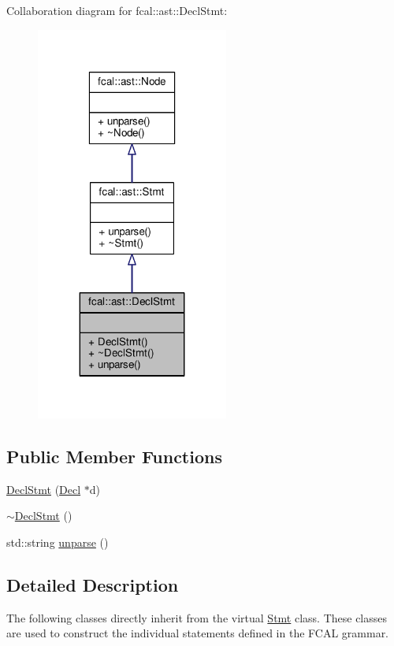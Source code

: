 Collaboration diagram for fcal\+:\+:ast\+:\+:Decl\+Stmt\+:
\nopagebreak
\begin{figure}[H]
\begin{center}
\leavevmode
\includegraphics[width=179pt]{classfcal_1_1ast_1_1DeclStmt__coll__graph}
\end{center}
\end{figure}
\subsection*{Public Member Functions}
\begin{DoxyCompactItemize}
\item 
\hyperlink{classfcal_1_1ast_1_1DeclStmt_a5e958867a6deda40d828b0416406485b}{Decl\+Stmt} (\hyperlink{classfcal_1_1ast_1_1Decl}{Decl} $\ast$d)
\item 
\hyperlink{classfcal_1_1ast_1_1DeclStmt_ae9dfa80c23f0dd282556a7edf608fde9}{$\sim$\+Decl\+Stmt} ()
\item 
std\+::string \hyperlink{classfcal_1_1ast_1_1DeclStmt_a8c353eab134e5c531d4df740d48b6c06}{unparse} ()
\end{DoxyCompactItemize}


\subsection{Detailed Description}
The following classes directly inherit from the virtual \hyperlink{classfcal_1_1ast_1_1Stmt}{Stmt} class. These classes are used to construct the individual statements defined in the F\+C\+AL grammar. 

